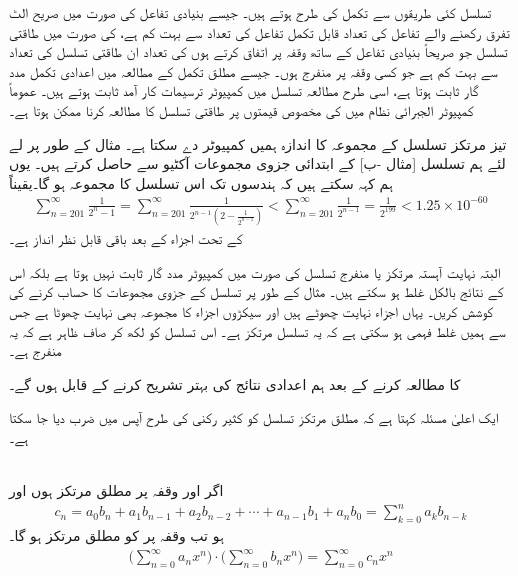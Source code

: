 تسلسل کئی طریقوں سے تکمل کی طرح ہوتے ہیں۔ جیسے بنیادی تفاعل کی صورت میں صریح الٹ تفرق رکھنے والے تفاعل کی تعداد قابل تکمل تفاعل کی تعداد سے بہت کم ہے،  کی صورت میں طاقتی تسلسل جو  صریحاً بنیادی تفاعل کے ساتھ  وقفہ  پر اتفاق کرتے ہوں کی تعداد ان طاقتی تسلسل کی تعداد سے بہت کم ہے جو کسی   وقفہ پر منفرج ہوں۔ جیسے  مطلق تکمل کے مطالعہ میں اعدادی تکمل مدد گار ثابت ہوتا ہے، اسی طرح مطالعہ تسلسل میں کمپیوٹر ترسیمات کار آمد ثابت ہوتے ہیں۔ عموماً کمپیوٹر الجبرائی نظام میں  کی مخصوص قیمتوں پر طاقتی تسلسل کا مطالعہ کرنا ممکن ہوتا ہے۔

تیز مرتکز تسلسل کے مجموعہ  کا اندازہ ہمیں کمپیوٹر دے سکتا ہے۔ مثال کے طور پر   لے لئے ہم تسلسل  [مثال -ب] کے ابتدائی جزوی مجموعات آکٹیو سے  حاصل کرتے ہیں۔ یوں ہم کہہ سکتے ہیں کہ  ہندسوں تک اس تسلسل کا مجموعہ  ہو گا۔یقیناً
\begin{align*}
\sum_{n=201}^{\infty}\frac{1}{2^n-1}=\sum_{n=201}^{\infty}\frac{1}{2^{n-1}(2-\tfrac{1}{2^{n-1}})}<\sum_{n=201}^{\infty}\frac{1}{2^{n-1}}=\frac{1}{2^{199}}<1.25\times 10^{-60}
\end{align*}
کے تحت  اجزاء کے بعد باقی قابل نظر انداز ہے۔

البتہ نہایت آہستہ مرتکز  یا منفرج تسلسل کی صورت میں کمپیوٹر مدد گار ثابت نہیں ہوتا ہے بلکہ اس کے نتائج بالکل غلط ہو سکتے ہیں۔ مثال کے طور پر تسلسل  کے جزوی مجموعات کا حساب کرنے کی کوشش کریں۔ یہاں اجزاء نہایت چھوٹے ہیں اور سیکڑوں اجزاء کا مجموعہ بھی نہایت چھوٹا ہے جس سے ہمیں غلط فہمی ہو سکتی ہے کہ یہ تسلسل مرتکز ہے۔ اس تسلسل کو  لکھ کر صاف ظاہر ہے کہ یہ منفرج ہے۔

 کا مطالعہ کرنے کے بعد ہم اعدادی نتائج کی بہتر تشریح کرنے کے قابل ہوں گے۔

ایک اعلیٰ مسئلہ کہتا ہے کہ مطلق مرتکز تسلسل کو کثیر رکنی کی طرح آپس میں ضرب دیا جا سکتا ہے۔

\\
اگر  اور  وقفہ  پر مطلق مرتکز ہوں اور
\begin{align*}
c_n=a_0b_n+a_1b_{n-1}+a_2b_{n-2}+\cdots+a_{n-1}b_1+a_nb_0=\sum_{k=0}^{n}a_kb_{n-k}
\end{align*}
ہو تب  وقفہ پر    کو مطلق مرتکز ہو گا۔
\begin{align*}
\big(\sum_{n=0}^{\infty}a_nx^n\big)\cdot\big(\sum_{n=0}^{\infty}b_nx^n\big)=\sum_{n=0}^{\infty}c_nx^n
\end{align*}

